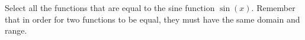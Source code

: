 \documentclass{ximera}
\author{Kenneth Berglund}
\begin{document}
\begin{exercise}
Select all the functions that are equal to the sine function $\sin(x)$. Remember that in order for two functions to be equal, they must have the same domain and range.

\begin{selectAll}

\end{selectAll}


\end{exercise}
\end{document}
